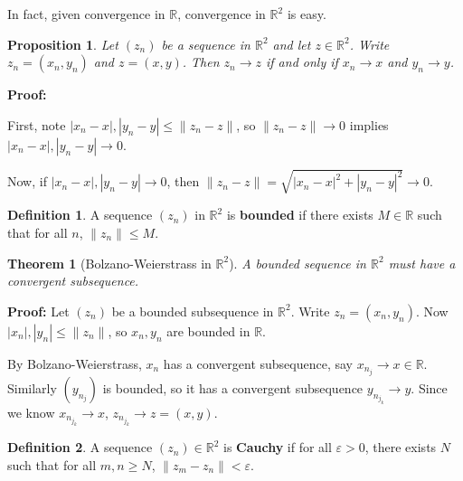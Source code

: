 \documentclass[12pt]{article}
\newtheorem{theorem}{Theorem}[section]
\newtheorem{proposition}{Proposition}[section]
\theoremstyle{definition}
\newtheorem{definition}{Definition}[section]
\theoremstyle{remark}
\begin{document}
In fact, given convergence in $\mathbb{R}$, convergence in $\mathbb{R}^2$ is easy.

\begin{proposition}
	Let $(z_n)$ be a sequence in $\mathbb{R}^2$ and let $z \in \mathbb{R}^2$. Write $z_n = (x_n, y_n)$ and $z = (x, y)$. Then $z_n \to z$ if and only if $x_n \to x$ and $y_n \to y$.
\end{proposition}

\begin{adjustbox}{minipage = \columnwidth - 25.5pt, margin=1em, frame=1pt, margin=0em}
\textbf{Proof:}

First, note $|x_n - x|, |y_n - y| \leq \|z_n - z\|$, so $\|z_n - z\| \to 0$ implies $|x_n - x|, |y_n - y| \to 0$.

Now, if $|x_n - x|, |y_n - y| \to 0$, then $\|z_n - z\| = \sqrt{|x_n - x|^2 + |y_n - y|^2} \to 0$.
\end{adjustbox}

\begin{definition}
	A sequence $(z_n)$ in $\mathbb{R}^2$ is \textbf{bounded} if there exists $M \in \mathbb{R}$ such that for all $n$, $\|z_n\| \leq M$.
\end{definition}

\begin{theorem}[Bolzano-Weierstrass in $\mathbb{R}^2$]
\item
	A bounded sequence in $\mathbb{R}^2$ must have a convergent subsequence.
\end{theorem}

\begin{adjustbox}{minipage = \columnwidth - 25.5pt, margin=1em, frame=1pt, margin=0em}
	\textbf{Proof:} Let $(z_n)$ be a bounded subsequence in $\mathbb{R}^2$. Write $z_n = (x_n, y_n)$. Now $|x_n|, |y_n| \leq \|z_n\|$, so $x_n, y_n$ are bounded in $\mathbb{R}$.

	By Bolzano-Weierstrass, $x_n$ has a convergent subsequence, say $x_{n_j} \to x \in \mathbb{R}$. Similarly $(y_{n_j})$ is bounded, so it has a convergent subsequence $y_{n_{j_k}} \to y$. Since we know $x_{n_{j_k}} \to x$, $z_{n_{j_k}} \to z = (x, y)$.
\end{adjustbox}

\begin{definition}
	A sequence $(z_n) \in \mathbb{R}^2$ is \textbf{Cauchy} if for all $\varepsilon > 0$, there exists $N$ such that for all $m, n \geq N$, $\|z_m - z_n\| < \varepsilon$.
\end{definition}
\end{document}
